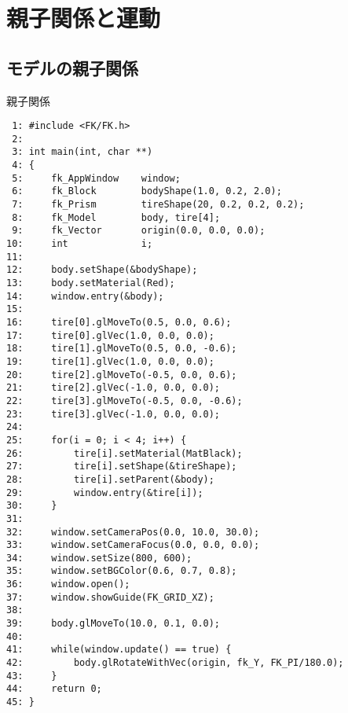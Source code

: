 ﻿\chapter{親子関係と運動}
\section{モデルの親子関係} \label{sec:07-parent}
\begin{itembox}[l]{親子関係}
\begin{small}
\begin{verbatim}
 1: #include <FK/FK.h>
 2: 
 3: int main(int, char **)
 4: {
 5:     fk_AppWindow    window;
 6:     fk_Block        bodyShape(1.0, 0.2, 2.0);
 7:     fk_Prism        tireShape(20, 0.2, 0.2, 0.2);
 8:     fk_Model        body, tire[4];
 9:     fk_Vector       origin(0.0, 0.0, 0.0);
10:     int             i;
11: 
12:     body.setShape(&bodyShape);
13:     body.setMaterial(Red);
14:     window.entry(&body);
15: 
16:     tire[0].glMoveTo(0.5, 0.0, 0.6);
17:     tire[0].glVec(1.0, 0.0, 0.0);
18:     tire[1].glMoveTo(0.5, 0.0, -0.6);
19:     tire[1].glVec(1.0, 0.0, 0.0);
20:     tire[2].glMoveTo(-0.5, 0.0, 0.6);
21:     tire[2].glVec(-1.0, 0.0, 0.0);
22:     tire[3].glMoveTo(-0.5, 0.0, -0.6);
23:     tire[3].glVec(-1.0, 0.0, 0.0);
24: 
25:     for(i = 0; i < 4; i++) {
26:         tire[i].setMaterial(MatBlack);
27:         tire[i].setShape(&tireShape);
28:         tire[i].setParent(&body);
29:         window.entry(&tire[i]);
30:     }
31: 
32:     window.setCameraPos(0.0, 10.0, 30.0);
33:     window.setCameraFocus(0.0, 0.0, 0.0);
34:     window.setSize(800, 600);
35:     window.setBGColor(0.6, 0.7, 0.8);
36:     window.open();
37:     window.showGuide(FK_GRID_XZ);
38: 
39:     body.glMoveTo(10.0, 0.1, 0.0);
40: 
41:     while(window.update() == true) {
42:         body.glRotateWithVec(origin, fk_Y, FK_PI/180.0);
43:     }
44:     return 0;
45: }
\end{verbatim}
\end{small}
\end{itembox}
